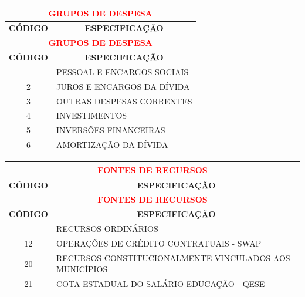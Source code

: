 \documentclass{article}
\begin{document}



\footnotesize\renewcommand*{\arraystretch}{2}\noindent\begin{longtable}[c]{m{1cm}|m{11cm}}\multicolumn{2}{c}{\cellcolor{gray!50} \textcolor{red} {\normalsize \textbf{GRUPOS DE DESPESA}}}\Tstrut  \\[2ex]\hline\hline\multicolumn{1}{c|}{\textbf{CÓDIGO}} & \multicolumn{1}{c}{\textbf{ESPECIFICAÇÃO}} \\\hline\endfirsthead\multicolumn{2}{c}{\cellcolor{gray!50} \textcolor{red} {\normalsize \textbf{GRUPOS DE DESPESA}}}\Tstrut  \\[2ex]\hline\hline\multicolumn{1}{c|}{\textbf{CÓDIGO}} & \multicolumn{1}{c}{\textbf{ESPECIFICAÇÃO}} \\\hline\endhead\endfoot\hline\hline\hline\endlastfoot\multicolumn{1}{c|}{ 1 } & PESSOAL E ENCARGOS SOCIAIS \\
\multicolumn{1}{c|}{ 2 } & JUROS E ENCARGOS DA DÍVIDA \\
\multicolumn{1}{c|}{ 3 } & OUTRAS DESPESAS CORRENTES \\
\multicolumn{1}{c|}{ 4 } & INVESTIMENTOS \\
\multicolumn{1}{c|}{ 5 } & INVERSÕES FINANCEIRAS \\
\multicolumn{1}{c|}{ 6 } & AMORTIZAÇÃO DA DÍVIDA \\\end{longtable}\noindent\begin{longtable}[c]{m{1cm}|m{11cm}}\multicolumn{2}{c}{\cellcolor{gray!50} \textcolor{red} {\normalsize \textbf{FONTES DE RECURSOS}}}\Tstrut  \\[2ex]\hline\hline\multicolumn{1}{c|}{\textbf{CÓDIGO}} & \multicolumn{1}{c}{\textbf{ESPECIFICAÇÃO}} \\\hline\endfirsthead\multicolumn{2}{c}{\cellcolor{gray!50} \textcolor{red} {\normalsize \textbf{FONTES DE RECURSOS}}}\Tstrut  \\[2ex]\hline\hline\multicolumn{1}{c|}{\textbf{CÓDIGO}} & \multicolumn{1}{c}{\textbf{ESPECIFICAÇÃO}} \\\hline\endhead\endfoot\hline\hline\hline\endlastfoot\multicolumn{1}{c|}{ 10 } & RECURSOS ORDINÁRIOS \\
\multicolumn{1}{c|}{ 12 } & OPERAÇÕES DE CRÉDITO CONTRATUAIS - SWAP \\
\multicolumn{1}{c|}{ 20 } & RECURSOS CONSTITUCIONALMENTE VINCULADOS AOS MUNICÍPIOS \\
\multicolumn{1}{c|}{ 21 } & COTA ESTADUAL DO SALÁRIO EDUCAÇÃO - QESE \\

\end{longtable}
\end{document}
